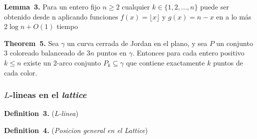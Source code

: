 \documentclass[xcolor=table]{beamer}
\begin{document}
\begin{mdframe}%

\begin{mdbmarginx}{1ex}{0pt}{1ex}{0pt}%
\noindent{}\textbf{Lemma~3.} \mdbr
{}Para un entero fijo $n \geq 2$ cualquier $k \in \{1,2,...,n\}$ puede ser obtenido desde n
aplicando funciones $f(x) = \lfloor x \rfloor$ y $g(x)= n - x$ en a lo más $2 \log n + O(1)$ tiempo%
\end{mdbmarginx}%
\end{mdframe}%

\begin{mdframe}%

\begin{mdbmarginx}{1ex}{0pt}{1ex}{0pt}%
\noindent{}\textbf{Theorem~5.} \mdbr
{}Sea $\gamma$ un curva cerrada de Jordan en el plano, y sea $P$ un conjunto 3 coloreado balanceado de $3n$ puntos
en $\gamma$. Entonces para cada entero positivo $k \leq n$ existe un $2$-arco conjunto $P_{k} \subseteq \gamma$ 
que contiene exactamente $k$ puntos de cada color.%
\end{mdbmarginx}%
\end{mdframe}%

\begin{mdframe}%

\frametitle{$L$-lineas en el \emph{lattice}}\label{heading-sec-l-lineas-en-el--lattice-}%
\end{mdframe}\label{sec-l-lineas-en-el--lattice-}%

\begin{mdframe}%

\begin{mdbmarginx}{1ex}{0pt}{1ex}{0pt}%
\noindent{}\textbf{Definition~3.} ({\itshape L-linea})\mdbr%
\end{mdbmarginx}%

\begin{mdbmarginx}{1ex}{0pt}{1ex}{0pt}%
\noindent{}\textbf{Definition~4.} ({\itshape Posicion general en el Lattice})\mdbr%
\end{mdbmarginx}%
\end{mdframe}%
\end{document}

